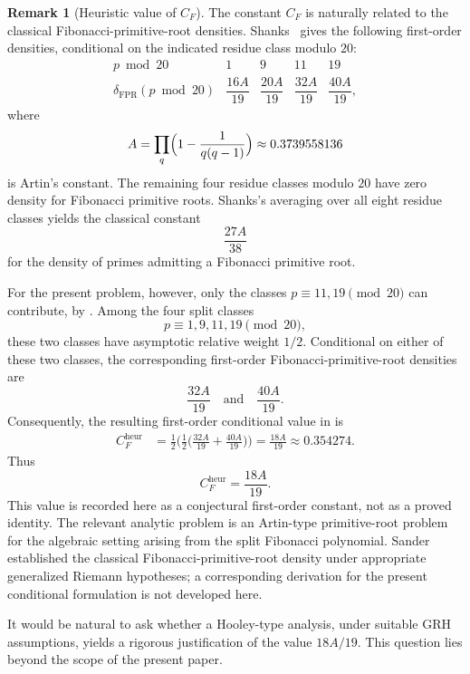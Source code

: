 \documentclass[preprint,12pt]{elsarticle}
\numberwithin{equation}{section}
\theoremstyle{plain}
\theoremstyle{definition}
\newtheorem{remark}[theorem]{Remark}
\begin{document}
\begin{remark}[Heuristic value of $C_F$]
\label{rem:density-heuristic}
The constant $C_F$ is naturally related to the classical
Fibonacci-primitive-root densities. Shanks~\cite{Shanks1972} gives the
following first-order densities, conditional on the indicated residue
class modulo $20$:
\[
\begin{array}{c|cccc}
p\bmod20 & 1 & 9 & 11 & 19\\
\hline
\delta_{\mathrm{FPR}}(p\bmod20)
& \dfrac{16A}{19}
& \dfrac{20A}{19}
& \dfrac{32A}{19}
& \dfrac{40A}{19},
\end{array}
\]
where
\[
A=\prod_q\Bigl(1-\frac1{q(q-1)}\Bigr)\approx0.3739558136
\]
is Artin's constant. The remaining four residue classes modulo $20$
have zero density for Fibonacci primitive roots. Shanks's averaging
over all eight residue classes yields the classical constant
\[
\frac{27A}{38}
\]
for the density of primes admitting a Fibonacci primitive root.
 
For the present problem, however, only the classes
$p\equiv11,19\pmod{20}$ can contribute, by . Among the
four split classes
\[
p\equiv1,9,11,19\pmod{20},
\]
these two classes have asymptotic relative weight $1/2$. Conditional
on either of these two classes, the corresponding first-order
Fibonacci-primitive-root densities are
\[
\frac{32A}{19}
\quad\text{and}\quad
\frac{40A}{19}.
\]
Consequently, the resulting first-order conditional value in
 is
\[
\begin{aligned}
C_F^{\mathrm{heur}}
&=
\frac12
\Biggl(
\frac12
\Biggl(
\frac{32A}{19}+\frac{40A}{19}
\Biggr)
\Biggr)
=
\frac{18A}{19}
\approx0.354274.
\end{aligned}
\]
Thus
\[
\boxed{C_F^{\mathrm{heur}}=\dfrac{18A}{19}}.
\]
This value is recorded here as a conjectural first-order constant,
not as a proved identity. The relevant analytic problem is an
Artin-type primitive-root problem for the algebraic setting arising
from the split Fibonacci polynomial. Sander~\cite{Sander1990}
established the classical Fibonacci-primitive-root density under
appropriate generalized Riemann hypotheses; a corresponding
derivation for the present conditional formulation is not developed
here.
\end{remark}
 
It would be natural to ask whether a Hooley-type analysis, under
suitable GRH assumptions, yields a rigorous justification of the
value $18A/19$. This question lies beyond the scope of the present
paper.
 
\end{document}
